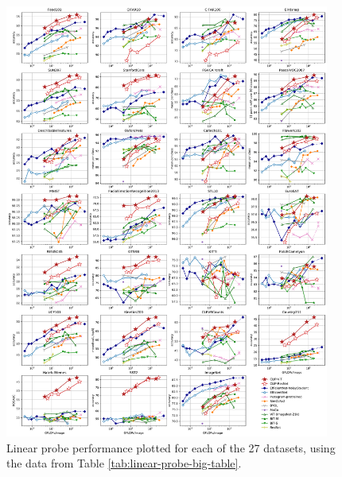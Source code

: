\documentclass{article}
\begin{document}
\begin{figure}[t]
\begin{center}
\centerline{\includegraphics[width=0.95\textwidth]{linear-probe-per-dataset.pdf}}
\caption{Linear probe performance plotted for each of the 27 datasets, using the data from Table \ref{tab:linear-probe-big-table}.}
\label{linear-probe-per-dataset}
\end{center}
\end{figure}
\end{document}
